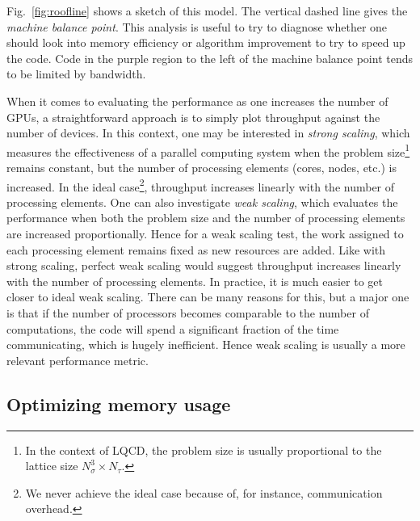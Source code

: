 Fig.~\ref{fig:roofline} shows a sketch of this model. The vertical
dashed line gives the {\it machine balance point}.
This analysis is useful to try to diagnose whether one should look into
memory efficiency or algorithm improvement to try to speed up the code.
Code in the purple region to the left of the machine balance point
tends to be limited by bandwidth.

When it comes to evaluating the performance as one increases the number
of GPUs, a straightforward approach is to simply plot throughput against
the number of devices. In this context, one may be interested in
{\it strong scaling}, which measures the effectiveness 
of a parallel computing system when the problem size\footnote{In the context
of LQCD, the problem size is usually proportional to the lattice size
$N_\sigma^3\times N_\tau$.} remains constant, 
but the number of processing elements (cores, nodes, etc.) is increased.
In the ideal case\footnote{We never achieve the ideal case because of,
for instance, communication overhead.}, throughput
increases linearly with the number of processing elements.
One can also investigate {\it weak scaling},
which evaluates the performance when both the problem size and the number 
of processing elements are increased proportionally. 
Hence for a weak scaling test, the work assigned to each processing element 
remains fixed as new resources are added. Like with strong scaling,
perfect weak scaling would suggest throughput increases linearly with
the number of processing elements. In practice, it is much easier to
get closer to ideal weak scaling. There can be many reasons
for this, but a major one is that if the number of processors becomes
comparable to the number of computations, the code will spend a significant fraction
of the time communicating, which is hugely inefficient. Hence weak scaling is
usually a more relevant performance metric. 


\subsection{Optimizing memory usage}\label{sec:memory}

